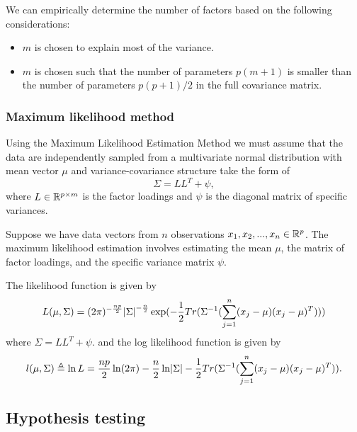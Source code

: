 \begin{refsection}
\begin{remark}
We can empirically determine the number of factors based on the following considerations:
\begin{itemize}
	\item $m$ is chosen to explain most of the variance.
	\item $m$ is chosen such that the number of parameters $p(m+1)$ is smaller than the number of parameters $p(p+1)/2$ in the full covariance matrix.
\end{itemize}	
	
\end{remark}

\subsubsection{Maximum likelihood method}

\begin{remark}
Using the Maximum Likelihood Estimation Method we must assume that the data are independently sampled from a multivariate normal distribution with mean vector $\mu$ and variance-covariance structure take the form of
$$\Sigma = LL^T + \psi,$$
where $L\in \mathbb{R}^{p\times m}$ is the factor loadings and $\psi$ is the diagonal matrix of specific variances.
\end{remark}



\begin{lemma}\cite[496]{johnson2007applied}
	
Suppose we have data vectors from $n$ observations $x_1,x_2,...,x_n \in \mathbb{R}^p$. The maximum likelihood estimation involves estimating the mean $\mu$, the matrix of factor loadings, and the specific variance matrix $\psi$.

The likelihood function is given by	
	$$L(\mu,\Sigma)=(2\pi)^{-\frac{np}{2}}\abs{\Sigma}^{-\frac{n}{2}}\exp(-\frac{1}{2}Tr(\Sigma^{-1}(\sum_{j=1}^{n}(x_j-\mu)(x_j-\mu)^T))) $$
where $\Sigma = LL^T + \psi.$
and the log likelihood function is given by
	$$l(\mu,\Sigma)\triangleq \ln L =\frac{np}{2}\ln (2\pi)-\frac{n}{2}\ln \abs{\Sigma} -\frac{1}{2}Tr(\Sigma^{-1}(\sum_{j=1}^{n}(x_j-\mu)(x_j-\mu)^T)).$$	
\end{lemma}

\subsection{Hypothesis testing}


\end{refsection}
